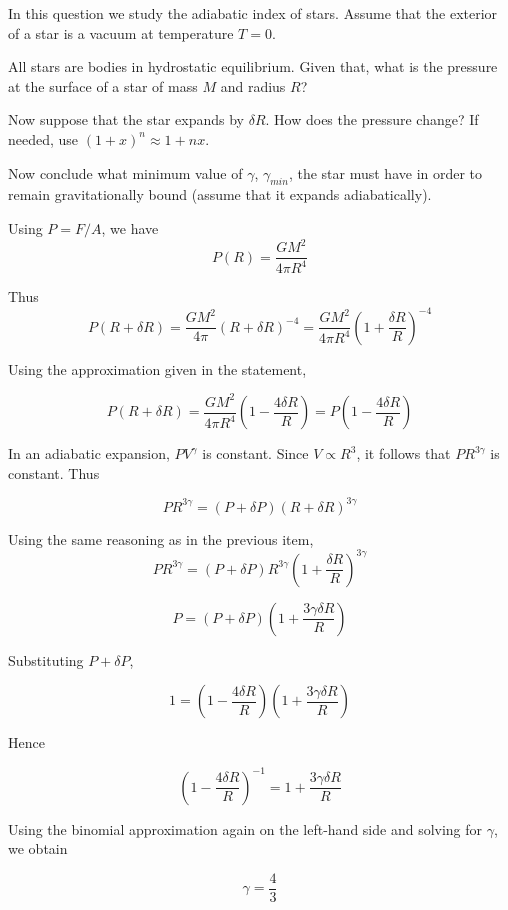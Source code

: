 \documentclass[11pt]{article}
\begin{document}
\begin{pproblem}
    In this question we study the adiabatic index of stars. Assume that the exterior of a star is a vacuum at temperature \(T=0\).
    \begin{alternativas}
        \item All stars are bodies in hydrostatic equilibrium. Given that, what is the pressure at the surface of a star of mass \(M\) and radius \(R\)?
        \item Now suppose that the star expands by \(\delta R\). How does the pressure change? If needed, use \((1+x)^n\approx 1+nx\).
        \item Now conclude what minimum value of \(\gamma\), \(\gamma_{min}\), the star must have in order to remain gravitationally bound (assume that it expands adiabatically).
    \end{alternativas}

\begin{pssolution*}{}{}
    \begin{alternativas}
        \item Using \(P = F/A\), we have
        \[P(R) = \frac{GM^2}{4\pi R^4}\]

        \item Thus
        \[P(R+\delta R)  = \frac{GM^2}{4\pi}(R+\delta R)^{-4} = \frac{GM^2}{4\pi R^4}\left(1+\frac{\delta R}{R}\right)^{-4}\]

        Using the approximation given in the statement,

        \[\boxed{P(R+\delta R) = \frac{GM^2}{4\pi R^4}\left(1-\frac{4\delta R}{R}\right) = P\left(1-\frac{4\delta R}{R}\right)}\]
    
        \item In an adiabatic expansion, \(PV^\gamma\) is constant. Since \(V\propto R^3\), it follows that \(PR^{3\gamma}\) is constant. Thus
        
        \[PR^{3\gamma} = (P+\delta P)(R + \delta R)^{3\gamma}\]

        Using the same reasoning as in the previous item,
        \[PR^{3\gamma} = (P+\delta P)R^{3\gamma}\left(1 + \frac{\delta R}{R}\right)^{3\gamma}\]

        \[P = (P+ \delta P)\left(1+\frac{3\gamma\delta R}{R}\right)\]

        Substituting \(P+\delta P\),

        \[1 = \left(1-\frac{4\delta R}{R}\right)\left(1+\frac{3\gamma\delta R}{R}\right)\]

        Hence

        \[\left(1-\frac{4\delta R}{R}\right)^{-1} = 1+\frac{3\gamma\delta R}{R}\]

        Using the binomial approximation again on the left-hand side and solving for \(\gamma\), we obtain

        \[\boxed{\gamma = \frac{4}{3}}\]
    \end{alternativas}
    
\end{pssolution*}
\end{pproblem}
\end{document}
